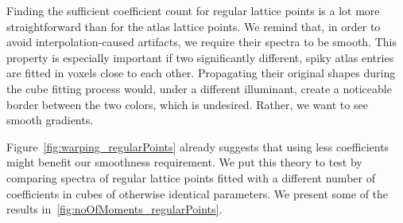 Finding the sufficient coefficient count for regular lattice points is a lot more straightforward than for the atlas lattice points. We remind that, in order to avoid interpolation-caused artifacts, we require their spectra to be smooth. This property is especially important if two significantly different, spiky atlas entries are fitted in voxels close to each other. Propagating their original shapes during the cube fitting process would, under a different illuminant, create a noticeable border between the two colors, which is undesired. Rather, we want to see smooth gradients.

Figure~\cref{fig:warping_regularPoints} already suggests that using less coefficients might benefit our smoothness requirement. We put this theory to test by comparing spectra of regular lattice points fitted with a different number of coefficients in cubes of otherwise identical parameters. We present some of the results in~\cref{fig:noOfMoments_regularPoints}.

